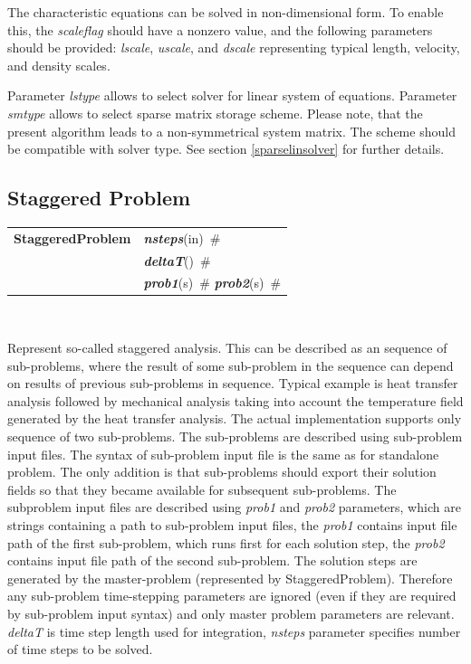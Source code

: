 \documentclass[a4paper]{article}
\makeatletter
\newcommand{\param}[1]{{\em #1}}
\newcommand{\keywordnotype}[1]{\mbox{{\it{\bf{#1}}}}}
\newcommand{\keyword}[2]{\mbox{{\keywordnotype{#1}\tiny (#2)}}}
\newcommand{\entKeywordInst}[1]{\mbox{{\bf{{#1}}}}}
\newcommand{\field}[2]{\mbox{\keyword{#1}{#2}~\#}}
\newenvironment{record}[1][]{\begin{tabular}{|ll}}{\end{tabular}\\}
\newcommand{\recentry}[2]{{#1}&{#2}\\}
\newcounter{rcc}
\newenvironment{record}[1][\textwidth]{\setcounter{rcc}{0}\begin{tabular*}{#1}{|ll@{\extracolsep{\fill}}r}}{\end{tabular*}\\}
\newcommand{\recentry}[2]{\ifthenelse{\value{rcc}>0}{&$\backslash$ \\}{\setcounter{rcc}{1}}{#1}&{#2}}
\makeatother
\begin{document}
The characteristic equations can be solved in non-dimensional form. To
enable this, the \param{scaleflag} should have a nonzero value,
and the following parameters should be provided: \param{lscale},
\param{uscale}, and \param{dscale} representing typical length,
velocity, and density scales.

Parameter \param{lstype} allows to select solver for linear system of
equations. Parameter \param{smtype} allows to select sparse matrix storage
scheme. Please note, that the present algorithm leads to a
non-symmetrical system
matrix. The scheme should be compatible with solver type. See section
\ref{sparselinsolver} for further details.

\subsection{Staggered Problem}
\label{staggeredproblem}
\begin{record}
\recentry{\entKeywordInst{StaggeredProblem}}{\field{nsteps}{in}}
\recentry{}{\field{deltaT}{}} \recentry{}{\field{prob1}{s} \field{prob2}{s}}
\end{record}

Represent so-called staggered analysis. This can be described as an
sequence of sub-problems, where the result of some sub-problem in the
sequence can depend on results of previous sub-problems in sequence.
Typical example is heat transfer analysis followed by mechanical
analysis taking into account the temperature field generated by the
heat transfer analysis.
The actual implementation supports only sequence of two sub-problems.
The sub-problems are described using sub-problem input files. The
syntax of sub-problem input file is the same as for standalone
problem. The only addition is that sub-problems should export their
solution fields so that they became available for subsequent
sub-problems. The subproblem input files are described using
\param{prob1} and \param{prob2} parameters, which are strings
containing a path to sub-problem input files, the \param{prob1}
contains input file path of the first sub-problem, which runs first
for each solution step, the \param{prob2} contains input file path of
the second sub-problem. The solution steps are generated by the
master-problem (represented by StaggeredProblem). Therefore any
sub-problem time-stepping parameters are ignored (even if they are
required by sub-problem input syntax) and only master problem
parameters are relevant. \param{deltaT} is time step length used for
integration, \param{nsteps} parameter specifies
number of time steps to be solved.
\end{document}
